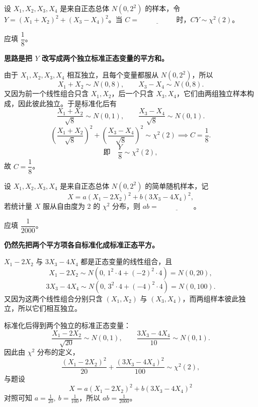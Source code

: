 ﻿\documentclass[lang=cn,11pt]{elegantbook}
\begin{document}
\begin{exercise}\label{exer:6-chi2-basic}
设 \(X_1, X_2, X_3, X_4\) 是来自正态总体 \(N(0, 2^2)\) 的样本，令 \(Y = (X_1+X_2)^2 + (X_3-X_4)^2\)。当 \(C =\,\underline{\hspace{2cm}}\) 时，\(CY \sim \chi^2(2)\)。
\end{exercise}

\begin{solution}
应填 \(\dfrac{1}{8}\)。

\textbf{思路是把 \(Y\) 改写成两个独立标准正态变量的平方和。}

由于 \(X_1,X_2,X_3,X_4\) 相互独立，且每个变量都服从 \(N(0,2^2)\)，所以
\[
X_1+X_2 \sim N(0,8),\qquad X_3-X_4 \sim N(0,8).
\]
又因为前一个线性组合只含 \(X_1,X_2\)，后一个只含 \(X_3,X_4\)，它们由两组独立样本构成，因此彼此独立。于是标准化后有
\[
\frac{X_1+X_2}{\sqrt{8}} \sim N(0,1),\qquad \frac{X_3-X_4}{\sqrt{8}} \sim N(0,1).
\]
\[
\left(\frac{X_1+X_2}{\sqrt{8}}\right)^{\!2} + \left(\frac{X_3-X_4}{\sqrt{8}}\right)^{\!2} \sim \chi^2(2) \implies C = \frac{1}{8}.
\]
\[
\text{即}\quad \frac{Y}{8}\sim \chi^2(2),
\]
故 \(C=\dfrac{1}{8}\)。
\end{solution}

\begin{exercise}\label{exer:6-chi2-ab}
设 \(X_1, X_2, X_3, X_4\) 是来自正态总体 \(N(0, 2^2)\) 的简单随机样本，记
\[
X = a(X_1 - 2X_2)^2 + b(3X_3 - 4X_4)^2,
\]
若统计量 \(X\) 服从自由度为 2 的 \(\chi^2\) 分布，则 \(ab =\,\underline{\hspace{2cm}}\)。
\end{exercise}

\begin{solution}
应填 \(\dfrac{1}{2000}\)。

\textbf{仍然先把两个平方项各自标准化成标准正态平方。}

\(X_1 - 2X_2\) 与 \(3X_3 - 4X_4\) 都是正态变量的线性组合，且
\[
X_1 - 2X_2 \sim N(0,\, 1^2\cdot 4 + (-2)^2\cdot 4) = N(0, 20),
\]
\[
3X_3 - 4X_4 \sim N(0,\, 3^2\cdot 4 + (-4)^2\cdot 4) = N(0, 100).
\]
又因为这两个线性组合分别只含 \((X_1,X_2)\) 与 \((X_3,X_4)\)，而两组样本彼此独立，所以它们相互独立。

标准化后得到两个独立的标准正态变量：
\[
\frac{X_1-2X_2}{\sqrt{20}}\sim N(0,1),\qquad \frac{3X_3-4X_4}{10}\sim N(0,1).
\]
因此由 \(\chi^2\) 分布的定义，
\[
\frac{(X_1-2X_2)^2}{20} + \frac{(3X_3-4X_4)^2}{100} \sim \chi^2(2),
\]
与题设
\[
X = a(X_1 - 2X_2)^2 + b(3X_3 - 4X_4)^2
\]
对照可知 \(a=\frac{1}{20},\ b=\frac{1}{100}\)，所以 \(ab=\frac{1}{2000}\)。
\end{solution}
\end{document}
